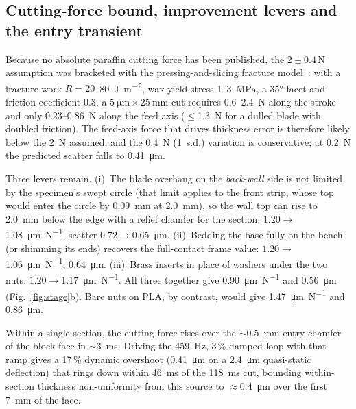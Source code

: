 \documentclass[11pt,a4paper]{article}
\begin{document}
\subsection{Cutting-force bound, improvement levers and the entry transient}
\label{sec:levers}
Because no absolute paraffin cutting force has been published, the $2\pm0.4$\,\si{\newton} assumption was bracketed with the pressing-and-slicing fracture model~\citep{Atkins2004}: with a fracture work $R=20$--\SI{80}{\joule\per\metre\squared}, wax yield stress 1--\SI{3}{\mega\pascal}, a \ang{35} facet and friction coefficient 0.3, a $\SI{5}{\micro\metre}\times\SI{25}{\milli\metre}$ cut requires 0.6--\SI{2.4}{\newton} along the stroke and only 0.23--\SI{0.86}{\newton} along the feed axis ($\leq$\SI{1.3}{\newton} for a dulled blade with doubled friction). The feed-axis force that drives thickness error is therefore likely below the \SI{2}{\newton} assumed, and the \SI{0.4}{\newton} (1~s.d.) variation is conservative; at \SI{0.2}{\newton} the predicted scatter falls to \SI{0.41}{\micro\metre}.

Three levers remain. (i)~The blade overhang on the \emph{back-wall} side is not limited by the specimen's swept circle (that limit applies to the front strip, whose top would enter the circle by \SI{0.09}{\milli\metre} at \SI{2.0}{\milli\metre}), so the wall top can rise to \SI{2.0}{\milli\metre} below the edge with a relief chamfer for the section: $1.20\rightarrow$\SI{1.08}{\micro\metre\per\newton}, scatter $0.72\rightarrow$\SI{0.65}{\micro\metre}. (ii)~Bedding the base fully on the bench (or shimming its ends) recovers the full-contact frame value: $1.20\rightarrow$\SI{1.06}{\micro\metre\per\newton}, \SI{0.64}{\micro\metre}. (iii)~Brass inserts in place of washers under the two nuts: $1.20\rightarrow$\SI{1.17}{\micro\metre\per\newton}. All three together give \SI{0.90}{\micro\metre\per\newton} and \SI{0.56}{\micro\metre} (Fig.~\ref{fig:stage}b). Bare nuts on PLA, by contrast, would give \SI{1.47}{\micro\metre\per\newton} and \SI{0.86}{\micro\metre}.

Within a single section, the cutting force rises over the $\sim$\SI{0.5}{\milli\metre} entry chamfer of the block face in $\sim$\SI{3}{\milli\second}. Driving the \SI{459}{\hertz}, 3\,\%-damped loop with that ramp gives a 17\,\% dynamic overshoot (\SI{0.41}{\micro\metre} on a \SI{2.4}{\micro\metre} quasi-static deflection) that rings down within \SI{46}{\milli\second} of the \SI{118}{\milli\second} cut, bounding within-section thickness non-uniformity from this source to $\approx$\SI{0.4}{\micro\metre} over the first \SI{7}{\milli\metre} of the face.
\end{document}
